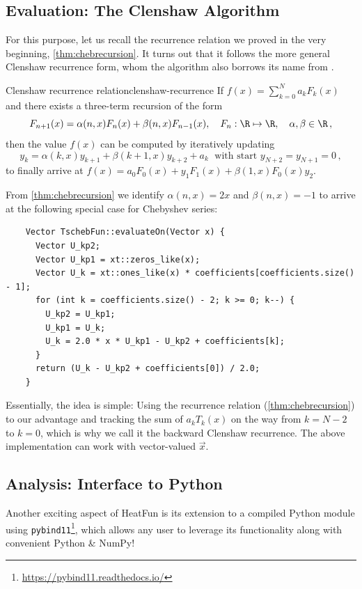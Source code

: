 \documentclass[12pt, a4paper]{article}
\begin{document}
  \subsection{Evaluation: The Clenshaw Algorithm}
  For this purpose, let us recall the recurrence relation we proved in the very beginning, \cref{thm:chebrecursion}.
  It turns out that it follows the more general Clenshaw recurrence form, whom the algorithm also borrows its name from \parencite[172-178]{art-of-sci-comp}.
  \begin{theorem}{Clenshaw recurrence relation}{clenshaw-recurrence}
    If $f(x) = \sum_{k=0}^N a_k F_k(x)$ and there exists a three-term recursion of the form
    $$F_{n+1}(x)=\alpha(n,x) F_n(x) + \beta(n,x) F_{n-1}(x),\quad F_n: \R \mapsto \R, \quad \alpha, \beta \in \R \,,$$
    then the value $f(x)$ can be computed by iteratively updating
    $$y_k = \alpha(k,x)y_{k+1}+\beta(k+1,x)y_{k+2}+a_k \; \text{ with start } y_{N+2} = y_{N+1} = 0\,,$$
    to finally arrive at $f(x) = a_0F_0(x)+y_1F_1(x)+\beta(1,x)F_0(x)y_2$.
  \end{theorem}

  From \cref{thm:chebrecursion} we identify $\alpha(n, x) = 2x$ and $\beta(n, x) = -1$ to arrive at the following special case for Chebyshev series:
  \begin{verbatim}
    Vector TschebFun::evaluateOn(Vector x) {
      Vector U_kp2;
      Vector U_kp1 = xt::zeros_like(x);
      Vector U_k = xt::ones_like(x) * coefficients[coefficients.size() - 1];
      for (int k = coefficients.size() - 2; k >= 0; k--) {
        U_kp2 = U_kp1;
        U_kp1 = U_k;
        U_k = 2.0 * x * U_kp1 - U_kp2 + coefficients[k];
      }
      return (U_k - U_kp2 + coefficients[0]) / 2.0;
    }
  \end{verbatim}

  Essentially, the idea is simple: Using the recurrence relation (\cref{thm:chebrecursion}) to our advantage and tracking the sum of $a_k T_k(x)$ on the way from $k = N-2$ to $k=0$, which is why we call it the backward Clenshaw recurrence.
  The above implementation can work with vector-valued $\vec{x}$.

  \subsection{Analysis: Interface to Python}
  Another exciting aspect of HeatFun is its extension to a compiled Python module using \texttt{pybind11}\footnote{\url{https://pybind11.readthedocs.io/}}, which allows any user to leverage its functionality along with convenient Python \& NumPy!
\end{document}
